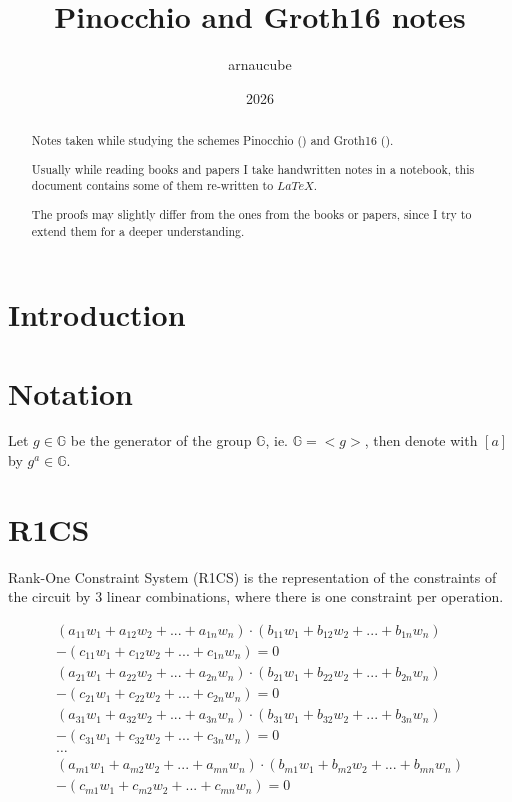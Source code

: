 \documentclass{article}
\title{Pinocchio and Groth16 notes}
\author{arnaucube}
\date{2026}
\begin{document}
\maketitle

\begin{abstract}
    Notes taken while studying the schemes Pinocchio (\cite{cryptoeprint:2013/279}) and Groth16 (\cite{cryptoeprint:2016/260}).

    Usually while reading books and papers I take handwritten notes in a notebook, this document contains some of them re-written to $LaTeX$.

    The proofs may slightly differ from the ones from the books or papers, since I try to extend them for a deeper understanding.
\end{abstract}

\tableofcontents
\newpage


\section{Introduction}



\section{Notation}

Let $g \in \mathbb{G}$ be the generator of the group $\mathbb{G}$, ie. $\mathbb{G}=<g>$, then denote with $[a]$ by $g^a \in \mathbb{G}$.

\section{R1CS}

Rank-One Constraint System (R1CS) is the representation of the constraints of the circuit by 3 linear combinations, where there is one constraint per operation.

$$
\begin{aligned}
(a_{11}w_1 + a_{12}w_2 + ... + a_{1n}w_n) \cdot (b_{11}w_1 + b_{12}w_2 + ... + b_{1n}w_n)\\- (c_{11}w_1 + c_{12}w_2 + ... + c_{1n}w_n) = 0
\\
(a_{21}w_1 + a_{22}w_2 + ... + a_{2n}w_n) \cdot (b_{21}w_1 + b_{22}w_2 + ... + b_{2n}w_n)\\- (c_{21}w_1 + c_{22}w_2 + ... + c_{2n}w_n) = 0
\\
(a_{31}w_1 + a_{32}w_2 + ... + a_{3n}w_n) \cdot (b_{31}w_1 + b_{32}w_2 + ... + b_{3n}w_n)\\- (c_{31}w_1 + c_{32}w_2 + ... + c_{3n}w_n) = 0
\\
\ldots
\\
(a_{m1}w_1 + a_{m2}w_2 + ... + a_{mn}w_n) \cdot (b_{m1}w_1 + b_{m2}w_2 + ... + b_{mn}w_n)\\- (c_{m1}w_1 + c_{m2}w_2 + ... + c_{mn}w_n) = 0
\end{aligned}
$$
\end{document}
